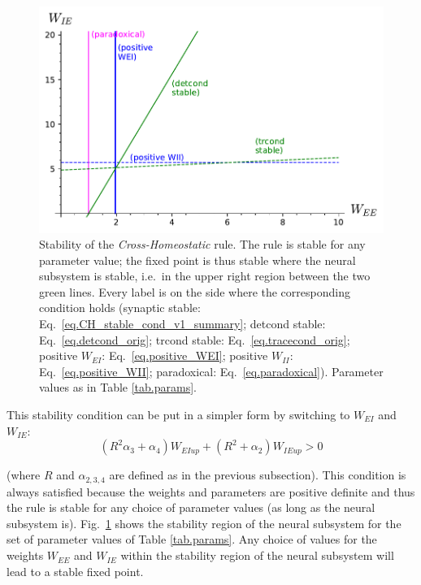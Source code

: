 \documentclass[twocolumn]{article}
\newcommand{\EE}{\mathit{EE}}
\newcommand{\EI}{\mathit{EI}}
\newcommand{\IE}{\mathit{IE}}
\newcommand{\II}{\mathit{II}}
\newcommand{\up}{\mathit{up}}
\begin{document}
\begin{figure}[ht]
\centering
\includegraphics[width=\linewidth]{CH_stability}
\caption{Stability of the {\em Cross-Homeostatic} rule. The rule is stable for any parameter value; the fixed point is thus stable where the neural subsystem is stable, i.e.\ in the upper right region between the two green lines. Every label is on the side where the corresponding condition  holds (synaptic stable: Eq.\ \ref{eq.CH_stable_cond_v1_summary}; detcond stable: Eq.\ \ref{eq.detcond_orig}; trcond stable: Eq.\ \ref{eq.tracecond_orig}; positive $W_{\EI}$: Eq.\ \ref{eq.positive_WEI}; positive $W_{\II}$: Eq.\ \ref{eq.positive_WII}; paradoxical: Eq.\ \ref{eq.paradoxical}). Parameter values as in Table \ref{tab.params}.}
\label{fig.CH_stability}
\end{figure}




This stability condition can be put in a simpler form by switching to $W_{\EI}$ and $W_{\IE}$:
\begin{equation}
(R^2 \alpha_3 + \alpha_4) W_{\EI\up} + (R^2 + \alpha_2) W_{\IE\up} > 0
\label{eq.CH_stable_cond_v2_summary}
\end{equation}

\noindent (where $R$ and $\alpha_{2,3,4}$ are defined as in the previous subsection). This condition is always satisfied because the weights and parameters are positive definite and thus the rule is stable for any choice of parameter values (as long as the neural subsystem is). Fig.\ \ref{fig.CH_stability} shows the stability region of the neural subsystem for the set of parameter values of Table \ref{tab.params}. Any choice of values for the weights $W_{\EE}$ and $W_{\IE}$ within the stability region of the neural subsystem will lead to a stable fixed point.
\end{document}
